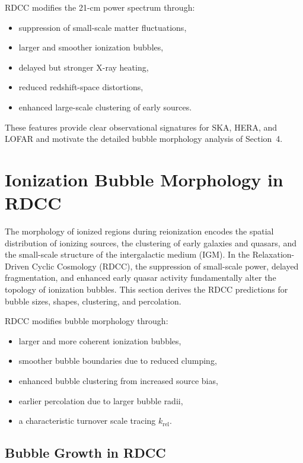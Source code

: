 \documentclass[11pt,a4paper]{article}
\begin{document}
RDCC modifies the 21-cm power spectrum through:
\begin{itemize}
\item suppression of small-scale matter fluctuations,
\item larger and smoother ionization bubbles,
\item delayed but stronger X-ray heating,
\item reduced redshift-space distortions,
\item enhanced large-scale clustering of early sources.
\end{itemize}

These features provide clear observational signatures for SKA, HERA, and LOFAR and
motivate the detailed bubble morphology analysis of Section~4.

\section{Ionization Bubble Morphology in RDCC}

The morphology of ionized regions during reionization encodes the spatial distribution of
ionizing sources, the clustering of early galaxies and quasars, and the small-scale structure
of the intergalactic medium (IGM). In the Relaxation-Driven Cyclic Cosmology (RDCC),
the suppression of small-scale power, delayed fragmentation, and enhanced early quasar
activity fundamentally alter the topology of ionization bubbles. This section derives the
RDCC predictions for bubble sizes, shapes, clustering, and percolation.

RDCC modifies bubble morphology through:
\begin{itemize}
\item larger and more coherent ionization bubbles,
\item smoother bubble boundaries due to reduced clumping,
\item enhanced bubble clustering from increased source bias,
\item earlier percolation due to larger bubble radii,
\item a characteristic turnover scale tracing $k_{\mathrm{rel}}$.
\end{itemize}

\subsection{Bubble Growth in RDCC}
\end{document}
